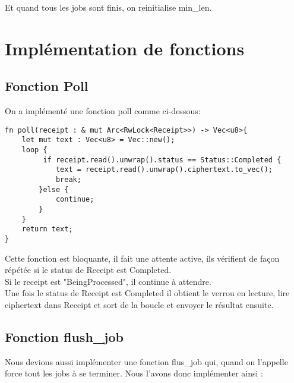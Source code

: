 \documentclass{article}
\begin{document}
Et quand tous les jobs sont finis, on reinitialise min\_len. 



\section{Implémentation de fonctions}
\subsection{Fonction Poll}
On a implémenté une fonction poll comme ci-dessous:
\begin{lstlisting}
fn poll(receipt : & mut Arc<RwLock<Receipt>>) -> Vec<u8>{
    let mut text : Vec<u8> = Vec::new();
    loop {
         if receipt.read().unwrap().status == Status::Completed {
            text = receipt.read().unwrap().ciphertext.to_vec();
            break;
        }else {
            continue;
        }
    }
    return text;
}\end{lstlisting}
Cette fonction est bloquante, il fait une attente active, ils vérifient de façon répétée si le status de Receipt est Completed.\\
Si le receipt est "BeingProcessed", il continue à attendre.\\
Une fois le status de Receipt est Completed il obtient le verrou en lecture, lire ciphertext dans Receipt et sort de la boucle et envoyer le résultat ensuite.



\subsection{Fonction flush\_job}
Nous devions aussi implémenter une fonction flus\_job qui, quand on l'appelle force tout les jobs à se terminer. Nous l'avons donc implémenter ainsi :
\end{document}

